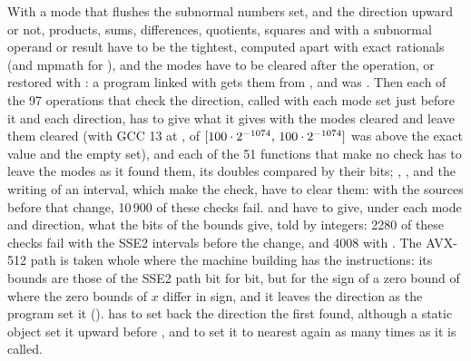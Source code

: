 \medskip
With a mode that flushes the subnormal numbers set, and the direction upward
or not, products, sums, differences, quotients, squares and  with
a subnormal operand or result have to be the tightest, computed apart with
exact rationals (and mpmath for ), and the modes have to be
cleared after the operation, or restored with
: a program linked with  gets
them from , and \code{[1e-300] * [1e-20]} was
\code{[0, 0]}.\newinvfive{} Then each of the 97 operations that check the
direction, called with each mode set just before it and each direction, has
to give what it gives with the modes cleared and leave them cleared (with
GCC 13 at ,  of $[100\cdot2^{-1074},\,100\cdot2^{-1074}]$ was above the
exact value and  the empty set), and each of the 51
functions that make no check has to leave the modes as it found them, its
doubles compared by their bits; , ,
 and the writing of an interval, which make the check, have to
clear them: with the sources before that change, 10\,900 of these checks
fail.\newinvfive{}  and  have to
give, under each mode and direction, what the bits of the bounds give, told
by integers: 2280 of these checks fail with the SSE2 intervals before the
change, and 4008 with . The AVX-512 path is
taken whole where the machine building has the instructions: its bounds are
those of the SSE2 path bit for bit, but for the sign of a zero bound of
 where the zero bounds of $x$ differ in sign, and it leaves the
direction as the program set it ().\newinvfive{}
 has to set back the direction the first
 found, although a static object set it upward before
, and  to set it to nearest
again as many times as it is called.

